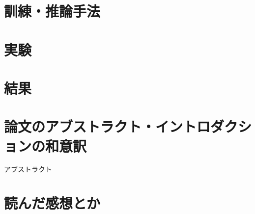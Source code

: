 \documentclass[a4paper, dvipdfmx, 10pt]{article}
\begin{document}
\section{訓練・推論手法}
\label{sec:org9aaa011}
\section{実験}
\label{sec:org7075885}
\section{結果}
\label{sec:org06332ad}
\section{論文のアブストラクト・イントロダクションの和意訳}
\label{sec:orgef7b638}
アブストラクト\\
\section{読んだ感想とか}
\label{sec:org3137479}
\end{document}
